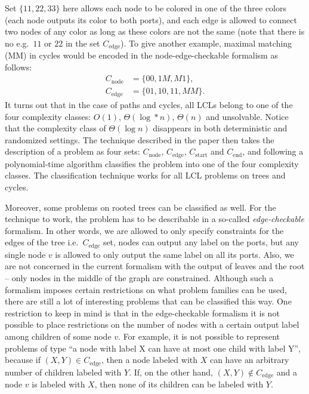 Set $\{ 11, 22, 33 \}$ here allows each node to be colored in one of the three colors
(each node outputs its color to both ports), and each edge is allowed to connect
two nodes of any color as long as these colors are not the same (note that there is no
e.g.\ $11$ or $22$ in the set $C_{\textrm{edge}}$). To give another example, maximal matching (MM) in cycles
would be encoded in the node-edge-checkable formalism as follows:
\begin{align*}
C_{\textrm{node}} &= \{ 00, 1M, M1 \}, \\
C_{\textrm{edge}} &= \{ 01, 10, 11, MM \}.
\end{align*}
It turns out that in the case of paths and cycles, all LCLs belong to one of the four
complexity classes: $O(1)$, $\Theta(\log* n)$, $\Theta(n)$ and unsolvable. Notice that
the complexity class of $\Theta(\log n)$ disappears in both deterministic and randomized settings.
The technique described in the paper then takes the description of a problem as four sets: $C_{\textrm{node}}$,
$C_{\textrm{edge}}$, $C_{\textrm{start}}$ and $C_{\textrm{end}}$, and following a polynomial-time algorithm classifies the
problem into one of the four complexity classes. The classification technique works for all LCL
problems on trees and cycles.

Moreover, some problems on rooted trees can be classified as well. For the technique to work, the problem
has to be describable in a so-called \emph{edge-checkable} formalism. In other words, we are allowed to
only specify constraints for the edges of the tree i.e.\ $C_{\textrm{edge}}$ set, nodes can output any label
on the ports, but any single node $v$ is allowed to only output the same label on all its ports.
Also, we are not concerned in the current formalism with the output of leaves and the root -- only nodes in the
middle of the graph are constrained. Although such a formalism imposes certain restrictions on what
problem families can be used,
there are still a lot of interesting problems that can be classified this way. One restriction to keep in mind
is that in the edge-checkable formalism it is not possible to
place restrictions on the number of nodes with a certain output label
among children of some node $v$.
For example, it is not possible to represent problems of type
``a node with label X can have at most one child with label Y'',
because if $(X, Y) \in C_{\textrm{edge}}$, then a
node labeled with $X$ can have an arbitrary number of children
labeled with $Y$. If, on the other hand, $(X, Y) \notin C_{\textrm{edge}}$ and a node $v$ is labeled with $X$, then
none of its children can be labeled with $Y$.

